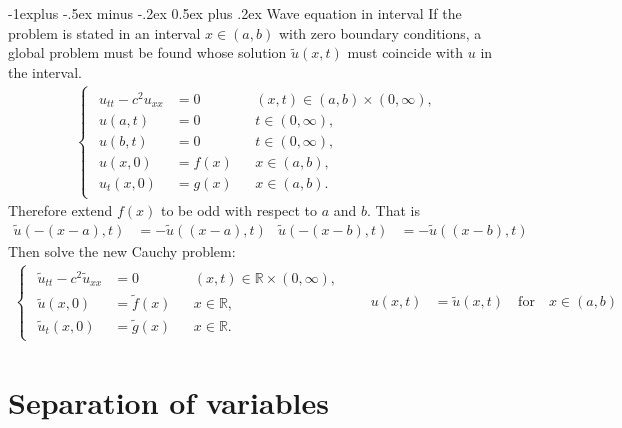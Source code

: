 \documentclass[10pt,landscape]{scrartcl}
\makeatletter
\renewcommand{\subsection}{\@startsection{subsection}{2}{0mm}%
                                {-1explus -.5ex minus -.2ex}%
                                {0.5ex plus .2ex}%
                                {\normalfont\normalsize\bfseries}}
\makeatother
\begin{document}
\begin{multicols*}{2}
\subsection{Wave equation in interval}
If the problem is stated in an interval $x\in(a,b)$ with zero boundary conditions, a global problem must be found whose solution $\tilde{u}(x,t)$ must coincide with $u$ in the interval. 
\begin{align*}
  \begin{cases}
    \begin{aligned}
      u_{tt} -c^2u_{xx} &= 0 & &(x,t) \in (a,b) \times (0,\infty), \\
      u(a,t) &= 0 & &t \in (0,\infty), \\
      u(b,t) &= 0 & &t \in (0,\infty), \\
      u(x,0) &= f(x) & &x \in (a,b), \\
      u_t(x,0) &= g(x) & &x \in (a,b).
    \end{aligned}
  \end{cases}
\end{align*}
Therefore extend $f(x)$ to be odd with respect to $a$ and $b$. That is
\begin{align*}
  \tilde{u}(-(x-a),t) &= -\tilde{u}((x-a),t) & \tilde{u}(-(x-b),t) &= -\tilde{u}((x-b),t) &
\end{align*}
Then solve the new Cauchy problem:
\begin{align*}
  \begin{cases}
    \begin{aligned}
      \tilde{u}_{tt} -c^2\tilde{u}_{xx} &= 0 & &(x,t) \in \mathbb{R} \times (0,\infty), \\
      \tilde{u}(x,0) &= \tilde{f}(x) & &x \in \mathbb{R}, \\
      \tilde{u}_t(x,0) &= \tilde{g}(x) & &x \in \mathbb{R}.
    \end{aligned}
  \end{cases}
  &&
  u(x,t)&=\tilde{u}(x,t) \quad \text{for} \quad x\in(a,b)
\end{align*}


\section{Separation of variables}

\end{multicols*}
\end{document}
